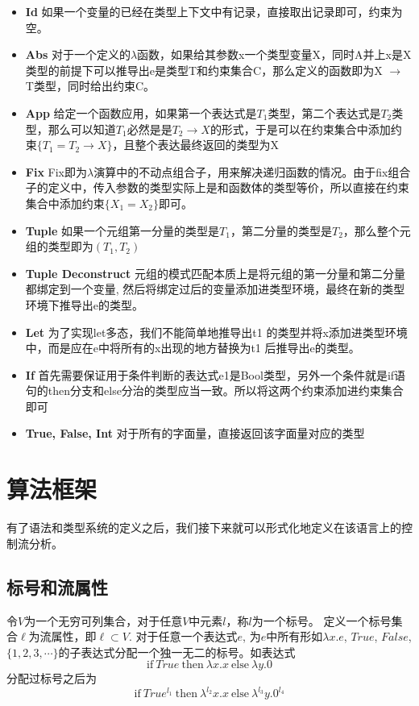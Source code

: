 \documentclass[12pt, titlepage]{article}
\begin{document}
	\begin{itemize}
		\item \textbf{Id} 如果一个变量的已经在类型上下文中有记录，直接取出记录即可，约束为空。
		\item \textbf{Abs} 对于一个定义的$\lambda$函数，如果给其参数x一个类型变量X，同时A并上x是X类型的前提下可以推导出e是类型T和约束集合C，那么定义的函数即为X $\to$ T类型，同时给出约束C。
		\item \textbf{App} 给定一个函数应用，如果第一个表达式是$T_1$类型，第二个表达式是$T_2$类型，那么可以知道$T_1$必然是是$T_2\to X$的形式，于是可以在约束集合中添加约束$\{T_1 = T_2\to X\}$，且整个表达最终返回的类型为X
		\item\textbf{Fix} Fix即为$\lambda$演算中的不动点组合子，用来解决递归函数的情况。由于fix组合子的定义中，传入参数的类型实际上是和函数体的类型等价，所以直接在约束集合中添加约束$\{X_1 = X_2\}$即可。
		\item\textbf{Tuple} 如果一个元组第一分量的类型是$T_1$，第二分量的类型是$T_2$，那么整个元组的类型即为$(T_1, T_2)$
		\item\textbf{Tuple Deconstruct} 元组的模式匹配本质上是将元组的第一分量和第二分量都绑定到一个变量, 然后将绑定过后的变量添加进类型环境，最终在新的类型环境下推导出e的类型。
		\item\textbf{Let} \cite{Milner}为了实现let多态，我们不能简单地推导出t1 的类型并将x添加进类型环境中，而是应在e中将所有的x出现的地方替换为t1 后推导出e的类型。
		\item\textbf{If} 首先需要保证用于条件判断的表达式e1是Bool类型，另外一个条件就是if语句的then分支和else分治的类型应当一致。所以将这两个约束添加进约束集合即可
		\item\textbf{True, False, Int} 对于所有的字面量，直接返回该字面量对应的类型
	\end{itemize}

\newpage
\section{算法框架}
有了语法和类型系统的定义之后，我们接下来就可以形式化地定义在该语言上的控制流分析。
\subsection{标号和流属性}
	令$V$为一个无穷可列集合，对于任意$V$中元素$l$，称$l$为一个标号。 定义一个标号集合$\ell$为流属性，即$\ell\subset V$. 对于任意一个表达式$e$, 为$e$中所有形如$\lambda x.e$, $True$, $False$, $\{1, 2, 3,\cdots\}$的子表达式分配一个独一无二的标号。如表达式$$\mathrm{if}\ True\ \mathrm{then}\ \lambda x.x\ \mathrm{else}\ \lambda y.0$$分配过标号之后为$$\mathrm{if}\ True^{l_1}\ \mathrm{then}\ \lambda^{l_2} x.x\ \mathrm{else}\ \lambda^{l_3} y.0^{l_4}$$
\end{document}
